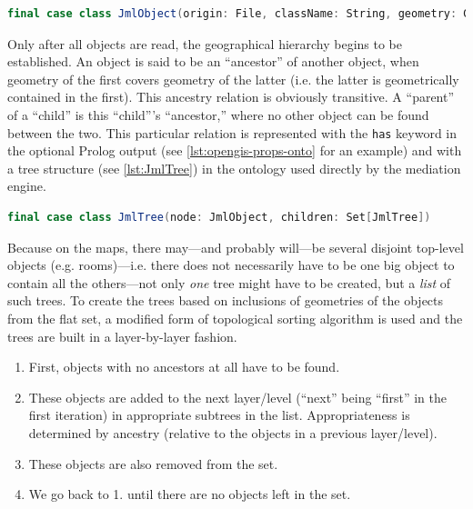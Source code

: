 \begin{lstlisting}[language=scala,caption={Definition of an object read from an OpenGIS map.},label=lst:JmlObject]
final case class JmlObject(origin: File, className: String, geometry: Geometry, props: Map[String, String])
\end{lstlisting}

Only after all objects are read, the geographical hierarchy begins to be established. An object is said to be an ``ancestor'' of another object, when geometry of the first covers geometry of the latter (i.e. the latter is geometrically contained in the first). This ancestry relation is obviously transitive. A ``parent'' of a ``child'' is this ``child'''s ``ancestor,'' where no other object can be found between the two. This particular relation is represented with the \texttt{has} keyword in the optional Prolog output (see \cref{lst:opengis-props-onto} for an example) and with a tree structure (see \cref{lst:JmlTree}) in the ontology used directly by the mediation engine.

\begin{lstlisting}[language=scala,caption={Definition of a (sub-)tree establishing the geometrical hierarchy and relations of OpenGIS objects.},label=lst:JmlTree]
final case class JmlTree(node: JmlObject, children: Set[JmlTree])
\end{lstlisting}

Because on the maps, there may---and probably will---be several disjoint top-level objects (e.g. rooms)---i.e. there does not necessarily have to be one big object to contain all the others---not only \emph{one} tree might have to be created, but a \emph{list} of such trees. To create the trees based on inclusions of geometries of the objects from the flat set, a modified form of topological sorting algorithm is used and the trees are built in a layer-by-layer fashion.

\begin{enumerate}
	\item First, objects with no ancestors at all have to be found.
	\item These objects are added to the next layer/level (``next'' being ``first'' in the first iteration) in appropriate subtrees in the list. Appropriateness is determined by ancestry (relative to the objects in a previous layer/level).
	\item These objects are also removed from the set.
	\item We go back to 1. until there are no objects left in the set.
\end{enumerate}

